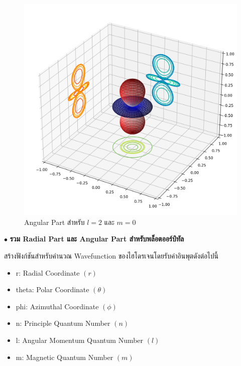 \begin{figure}[H]
    \centering
    \includegraphics[width=0.9\linewidth]{fig/wfn_hydro_angular.png}
    \caption{Angular Part สำหรับ $l = 2$ และ $m = 0$}
    \label{fig:wfn_hydro_angular}
\end{figure}

\bigskip

$\bullet$ \textbf{รวม Radial Part และ Angular Part สำหรับพล็อตออร์บิทัล}

สร้างฟังก์ชันสำหรับคำนวณ Wavefunction ของไฮโดรเจนโดยรับค่าอินพุตดังต่อไปนี้ 

\begin{itemize}[topsep=0pt,noitemsep]
    \item r: Radial Coordinate $(r)$
    
    \item theta: Polar Coordinate $(\theta)$
    
    \item phi: Azimuthal Coordinate $(\phi)$
    
    \item n: Principle Quantum Number $(n)$
    
    \item l: Angular Momentum Quantum Number $(l)$
    
    \item m: Magnetic Quantum Number $(m)$
\end{itemize}

